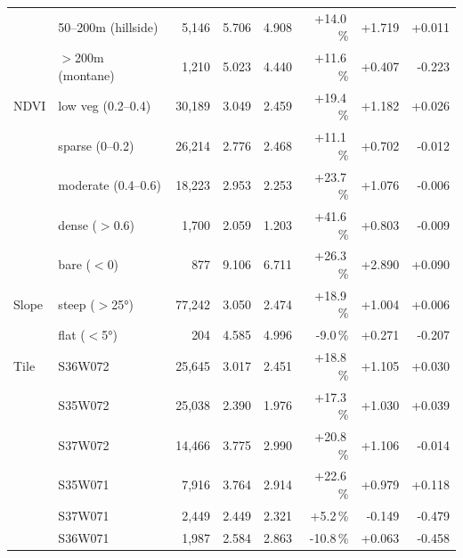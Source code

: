 \begin{table}[t]
\begin{tabular}{llrrrrrr}
 & 50–200m (hillside) & 5,146 & 5.706 & 4.908 & +14.0\,\% & +1.719 & +0.011 \\
 & $>$200m (montane) & 1,210 & 5.023 & 4.440 & +11.6\,\% & +0.407 & -0.223 \\
\addlinespace[2pt]
NDVI & low veg (0.2–0.4) & 30,189 & 3.049 & 2.459 & +19.4\,\% & +1.182 & +0.026 \\
 & sparse (0–0.2) & 26,214 & 2.776 & 2.468 & +11.1\,\% & +0.702 & -0.012 \\
 & moderate (0.4–0.6) & 18,223 & 2.953 & 2.253 & +23.7\,\% & +1.076 & -0.006 \\
 & dense ($>$0.6) & 1,700 & 2.059 & 1.203 & +41.6\,\% & +0.803 & -0.009 \\
 & bare ($<$0) & 877 & 9.106 & 6.711 & +26.3\,\% & +2.890 & +0.090 \\
\addlinespace[2pt]
Slope & steep ($>$25°) & 77,242 & 3.050 & 2.474 & +18.9\,\% & +1.004 & +0.006 \\
 & flat ($<$5°) & 204 & 4.585 & 4.996 & -9.0\,\% & +0.271 & -0.207 \\
\addlinespace[2pt]
Tile & S36W072 & 25,645 & 3.017 & 2.451 & +18.8\,\% & +1.105 & +0.030 \\
 & S35W072 & 25,038 & 2.390 & 1.976 & +17.3\,\% & +1.030 & +0.039 \\
 & S37W072 & 14,466 & 3.775 & 2.990 & +20.8\,\% & +1.106 & -0.014 \\
 & S35W071 & 7,916 & 3.764 & 2.914 & +22.6\,\% & +0.979 & +0.118 \\
 & S37W071 & 2,449 & 2.449 & 2.321 & +5.2\,\% & -0.149 & -0.479 \\
 & S36W071 & 1,987 & 2.584 & 2.863 & -10.8\,\% & +0.063 & -0.458 \\
\bottomrule
\end{tabular}
\end{table}

